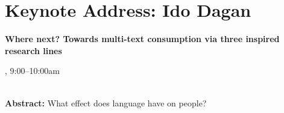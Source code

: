 \section{Keynote Address: Ido Dagan}

\begin{center}
\begin{Large}
{\bfseries\Large Where next? Towards multi-text consumption via three inspired research lines}\vspace{1em}\par
\end{Large}


\daydateyear, 9:00--10:00am \vspace{1em}\\
\PlenaryLoc \\
\vspace{1em}\par
\end{center}

\noindent
{\bfseries Abstract:} What effect does language have on people?

